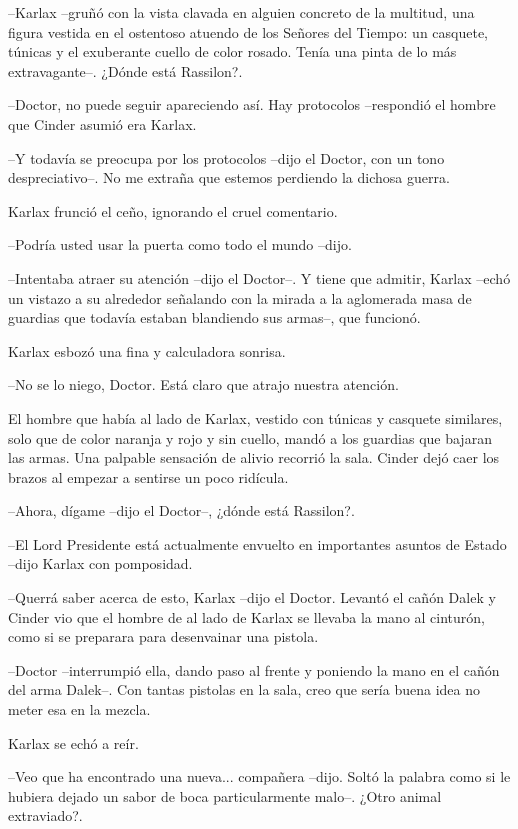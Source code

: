 --Karlax --gruñó con la vista clavada en alguien concreto de la multitud, una figura vestida en el ostentoso atuendo de los Señores del Tiempo: un casquete, túnicas y el exuberante cuello de color rosado. Tenía una pinta de lo más extravagante--. ¿Dónde está Rassilon?.

--Doctor, no puede seguir apareciendo así. Hay protocolos --respondió el hombre que Cinder asumió era Karlax.

--Y todavía se preocupa por los protocolos --dijo el Doctor, con un tono despreciativo--. No me extraña que estemos perdiendo la dichosa guerra.

Karlax frunció el ceño, ignorando el cruel comentario.

--Podría usted usar la puerta como todo el mundo --dijo.

--Intentaba atraer su atención --dijo el Doctor--. Y tiene que admitir, Karlax --echó un vistazo a su alrededor señalando con la mirada a la aglomerada masa de guardias que todavía estaban blandiendo sus armas--, que funcionó.

Karlax esbozó una fina y calculadora sonrisa.

--No se lo niego, Doctor. Está claro que atrajo nuestra atención.

El hombre que había al lado de Karlax, vestido con túnicas y casquete similares, solo que de color naranja y rojo y sin cuello, mandó a los guardias que bajaran las armas. Una palpable sensación de alivio recorrió la sala. Cinder dejó caer los brazos al empezar a sentirse un poco ridícula.

--Ahora, dígame --dijo el Doctor--, ¿dónde está Rassilon?.

--El Lord Presidente está actualmente envuelto en importantes asuntos de Estado --dijo Karlax con pomposidad.

--Querrá saber acerca de esto, Karlax --dijo el Doctor. Levantó el cañón Dalek y Cinder vio que el hombre de al lado de Karlax se llevaba la mano al cinturón, como si se preparara para desenvainar una pistola.

--Doctor --interrumpió ella, dando paso al frente y poniendo la mano en el cañón del arma Dalek--. Con tantas pistolas en la sala, creo que sería buena idea no meter esa en la mezcla.

Karlax se echó a reír.

--Veo que ha encontrado una nueva... compañera --dijo. Soltó la palabra como si le hubiera dejado un sabor de boca particularmente malo--. ¿Otro animal extraviado?.

